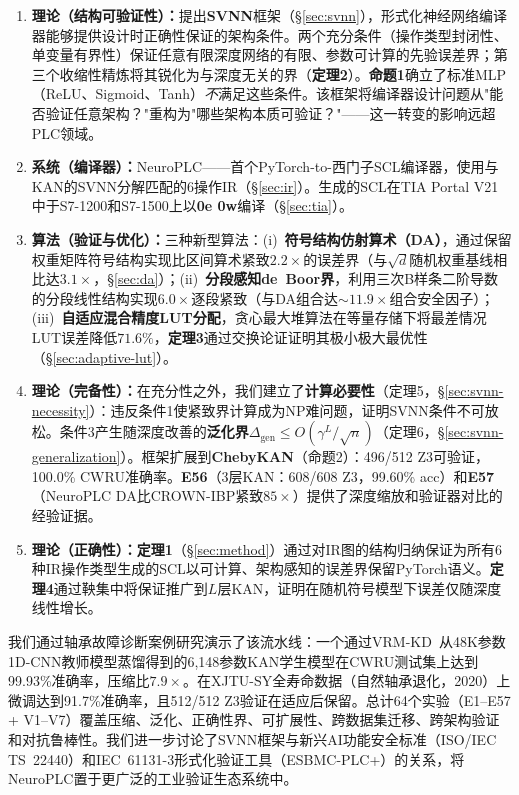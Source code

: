 \documentclass[journal,onecolumn]{IEEEtran}
\newcommand{\neuroplc}{NeuroPLC\xspace}
\theoremstyle{definition}
\theoremstyle{plain}
\theoremstyle{remark}
\begin{document}
\begin{enumerate}
    \item \textbf{理论（结构可验证性）：}提出\textbf{SVNN}框架（{\S}\ref{sec:svnn}），形式化神经网络编译器能够提供设计时正确性保证的架构条件。两个充分条件（操作类型封闭性、单变量有界性）保证任意有限深度网络的有限、参数可计算的先验误差界；第三个收缩性精炼将其锐化为与深度无关的界（\textbf{定理2}）。\textbf{命题1}确立了标准MLP（ReLU、Sigmoid、Tanh）\textit{不}满足这些条件。该框架将编译器设计问题从"能否验证任意架构？"重构为"哪些架构本质可验证？"——这一转变的影响远超PLC领域。
    \item \textbf{系统（编译器）：}\neuroplc{}——首个PyTorch-to-西门子SCL编译器，使用与KAN的SVNN分解匹配的6操作IR（{\S}\ref{sec:ir}）。生成的SCL在TIA Portal V21中于S7-1200和S7-1500上以\textbf{0e 0w}编译（{\S}\ref{sec:tia}）。
    \item \textbf{算法（验证与优化）：}三种新型算法：(i)~\textbf{符号结构仿射算术（DA）}，通过保留权重矩阵符号结构实现比区间算术紧致$2.2\times$的误差界（与$\sqrt{d}$随机权重基线相比达$3.1\times$，{\S}\ref{sec:da}）；(ii)~\textbf{分段感知de~Boor界}，利用三次B样条二阶导数的分段线性结构实现$6.0\times$逐段紧致（与DA组合达$\sim 11.9\times$组合安全因子）；(iii)~\textbf{自适应混合精度LUT分配}，贪心最大堆算法在等量存储下将最差情况LUT误差降低$71.6\%$，\textbf{定理3}通过交换论证证明其极小极大最优性（{\S}\ref{sec:adaptive-lut}）。
    \item \textbf{理论（完备性）：}在充分性之外，我们建立了\textbf{计算必要性}（定理5，{\S}\ref{sec:svnn-necessity}）：违反条件1使紧致界计算成为NP难问题，证明SVNN条件不可放松。条件3产生随深度改善的\textbf{泛化界}$\Delta_{\text{gen}} \leq O(\gamma^L/\sqrt{n})$（定理6，{\S}\ref{sec:svnn-generalization}）。框架扩展到\textbf{ChebyKAN}（命题2）：496/512 Z3可验证，100.0\% CWRU准确率。\textbf{E56}（3层KAN：608/608 Z3，99.60\% acc）和\textbf{E57}（NeuroPLC DA比CROWN-IBP紧致$85\times$）提供了深度缩放和验证器对比的经验证据。
    \item \textbf{理论（正确性）：}\textbf{定理1}（{\S}\ref{sec:method}）通过对IR图的结构归纳保证为所有6种IR操作类型生成的SCL以可计算、架构感知的误差界保留PyTorch语义。\textbf{定理4}通过鞅集中将保证推广到$L$层KAN，证明在随机符号模型下误差仅随深度线性增长。
\end{enumerate}

我们通过轴承故障诊断案例研究演示了该流水线：一个通过VRM-KD~\cite{zhang2025vrm}从48K参数1D-CNN教师模型蒸馏得到的6,148参数KAN学生模型在CWRU测试集上达到99.93\%准确率，压缩比$7.9\times$。在XJTU-SY全寿命数据（自然轴承退化，2020）上微调达到91.7\%准确率，且512/512 Z3验证在适应后保留。总计64个实验（E1--E57 + V1--V7）覆盖压缩、泛化、正确性界、可扩展性、跨数据集迁移、跨架构验证和对抗鲁棒性。我们进一步讨论了SVNN框架与新兴AI功能安全标准（ISO/IEC TS~22440）和IEC~61131-3形式化验证工具（ESBMC-PLC+）的关系，将\neuroplc{}置于更广泛的工业验证生态系统中。
\end{document}
